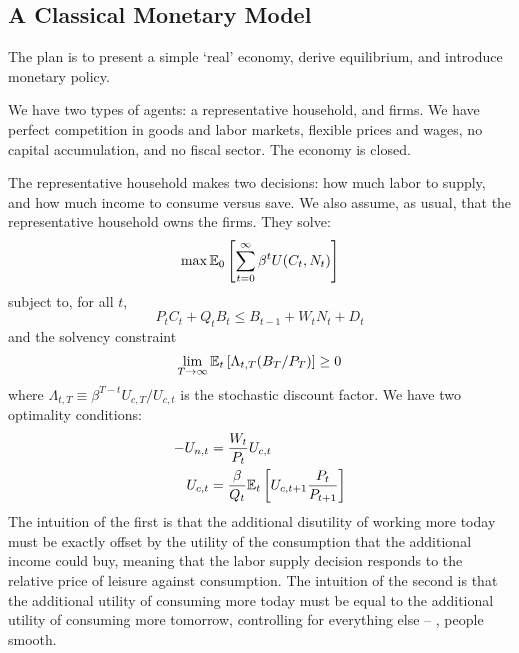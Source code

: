 \documentclass[10pt]{article}
\begin{document}
\subsection{A Classical Monetary Model}\label{subsec:2}

\begin{remark}
	The plan is to present a simple `real' economy, derive equilibrium, and introduce monetary policy.
\end{remark}

\begin{model}

\begin{assumption}
	We have two types of agents: a representative household, and firms. We have perfect competition in goods and labor markets, flexible prices and wages, no capital accumulation, and no fiscal sector. The economy is closed.
\end{assumption}

The representative household makes two decisions: how much labor to supply, and how much income to consume versus save. We also assume, as usual, that the representative household owns the firms. They solve:
\[
\max \mathbb{E}_0 \left[ \sum_{t=0}^\infty \beta^t U(C_t,N_t)\right]
\]
subject to, for all $t$,
\[P_tC_t + Q_tB_t \le B_{t-1} + W_tN_t + D_t\]and the solvency constraint \[\lim_{T\to\infty} \mathbb{E}_t \left[ \Lambda_{t,T} (B_T / P_T)\right] \ge 0\]where $\Lambda_{t,T} \equiv \beta^{T-t} U_{c,T} / U_{c,t}$ is the stochastic discount factor. We have two optimality conditions:
\begin{align*}
	-U_{n,t} &= \frac{W_t}{P_t} U_{c,t} \\ U_{c,t} &= \frac{\beta}{Q_t} \mathbb{E}_t \left[ U_{c,t+1} \frac{P_t}{P_{t+1}} \right]
\end{align*}
The intuition of the first is that the additional disutility of working more today must be exactly offset by the utility of the consumption that the additional income could buy, meaning that the labor supply decision responds to the relative price of leisure against consumption. The intuition of the second is that the additional utility of consuming more today must be equal to the additional utility of consuming more tomorrow, controlling for everything else -- \ie, people smooth.


\end{model}
\end{document}
